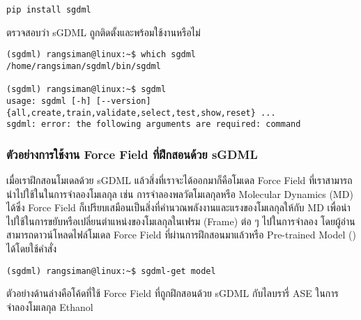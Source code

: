 \begin{lstlisting}[style=MyBash]
pip install sgdml
\end{lstlisting}

\vspace{1em}
\noindent ตรวจสอบว่า sGDML ถูกติดตั้งและพร้อมใช้งานหรือไม่

\begin{lstlisting}[style=MyBash]
(sgdml) rangsiman@linux:~$ which sgdml
/home/rangsiman/sgdml/bin/sgdml

(sgdml) rangsiman@linux:~$ sgdml
usage: sgdml [-h] [--version] {all,create,train,validate,select,test,show,reset} ...
sgdml: error: the following arguments are required: command
\end{lstlisting}

\subsubsection{ตัวอย่างการใช้งาน Force Field ที่ฝึกสอนด้วย sGDML}

เมื่อเราฝึกสอนโมเดลด้วย sGDML แล้วสิ่งที่เราจะได้ออกมาก็คือโมเดล Force Field ที่เราสามารถนำไปใช้ในในการจำลองโมเลกุล เช่น การจำลองพลวัตโมเลกุลหรือ Molecular Dynamics (MD) ได้ซึ่ง Force Field ก็เปรียบเสมือนเป็นสิ่งที่คำนวณพลังงานและแรงของโมเลกุลให้กับ MD เพื่อนำไปใช้ในการขยับหรือเปลี่ยนตำแหน่งของโมเลกุลในเฟรม (Frame) ต่อ ๆ ไปในการจำลอง  โดยผู้อ่านสามารถดาวน์โหลดไฟล์โมเดล Force Field ที่ผ่านการฝึกสอนมาแล้วหรือ Pre-trained Model () ได้โดยใช้คำสั่ง

\begin{lstlisting}[style=MyBash]
(sgdml) rangsiman@linux:~$ sgdml-get model
\end{lstlisting}

ตัวอย่างด้านล่างคือโค้ดที่ใช้ Force Field ที่ถูกฝึกสอนด้วย sGDML กับไลบรารี่ ASE ในการจำลองโมเลกุล Ethanol

